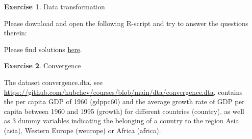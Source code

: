 \documentclass[
  12pt,
  oneside]{book}
\theoremstyle{definition}
\theoremstyle{definition}
\theoremstyle{definition}
\newtheorem{exercise}{Exercise}[chapter]
\theoremstyle{definition}
\theoremstyle{remark}
\begin{document}
\begin{exercise}
\protect\hypertarget{exr:exer4ds}{}\label{exr:exer4ds}Data transformation

Please download and open the following R-script and try to answer the questions therein:

Please find solutions \href{https://raw.githubusercontent.com/hubchev/courses/main/scr/data_transformation.R}{here}.
\end{exercise}

\begin{exercise}
\protect\hypertarget{exr:execonvergence}{}\label{exr:execonvergence}Convergence

The dataset convergence.dta, see \url{https://github.com/hubchev/courses/blob/main/dta/convergence.dta}, contains the per capita GDP of 1960 (gdppc60) and the average growth rate of GDP per capita between 1960 and 1995 (growth) for different countries (country), as well as 3 dummy variables indicating the belonging of a country to the region Asia (asia), Western Europe (weurope) or Africa (africa).


\end{exercise}
\end{document}
